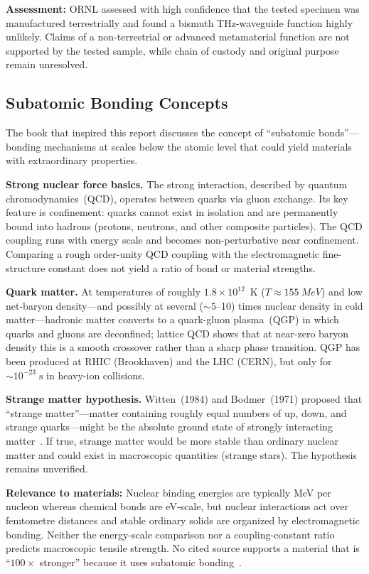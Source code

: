 \documentclass[aps,prd,twocolumn,superscriptaddress,nofootinbib,floatfix]{revtex4-2}
\begin{document}
\textbf{Assessment:} ORNL assessed with high confidence that the tested specimen
was manufactured terrestrially and found a bismuth THz-waveguide function highly
unlikely. Claims of a non-terrestrial or advanced metamaterial function are not
supported by the tested sample, while chain of custody and original purpose remain
unresolved.

\subsection{Subatomic Bonding Concepts}\label{sec:subatomic-bonding}

The book that inspired this report discusses the concept of ``subatomic
bonds''---bonding mechanisms at scales below the atomic level that could yield
materials with extraordinary properties.

\textbf{Strong nuclear force basics.} The strong interaction, described by quantum
chromodynamics~(QCD), operates between quarks via gluon exchange. Its key feature
is confinement: quarks cannot exist in isolation and are permanently bound into
hadrons (protons, neutrons, and other composite particles). The QCD coupling runs
with energy scale and becomes non-perturbative near confinement. Comparing a rough
order-unity QCD coupling with the electromagnetic fine-structure constant does not
yield a ratio of bond or material strengths.

\textbf{Quark matter.} At temperatures of roughly $1.8\times10^{12}$~K
($T\approx\SI{155}{MeV}$) and low net-baryon density---and possibly at several
(${\sim}5$--10) times nuclear density in cold matter---hadronic matter converts to
a quark-gluon plasma~(QGP) in which quarks and gluons are deconfined; lattice QCD
shows that at near-zero baryon density this is a smooth crossover rather than a
sharp phase transition. QGP has been produced at RHIC (Brookhaven) and the LHC
(CERN), but only for ${\sim}10^{-23}\;\text{s}$ in heavy-ion collisions.

\textbf{Strange matter hypothesis.} Witten~(1984) and Bodmer~(1971) proposed that
``strange matter''---matter containing roughly equal numbers of up, down, and
strange quarks---might be the absolute ground state of strongly interacting
matter~\cite{Witten1984,Bodmer1971}. If true, strange matter would be more stable
than ordinary nuclear matter and could exist in macroscopic quantities (strange
stars). The hypothesis remains unverified.

\textbf{Relevance to materials:} Nuclear binding energies are typically MeV per
nucleon whereas chemical bonds are eV-scale, but nuclear interactions act over
femtometre distances and stable ordinary solids are organized by electromagnetic
bonding. Neither the energy-scale comparison nor a coupling-constant ratio predicts
macroscopic tensile strength. No cited source supports a material that is
``$100\times$ stronger'' because it uses subatomic
bonding~\cite{Witten1984,Bodmer1971}.
\end{document}
